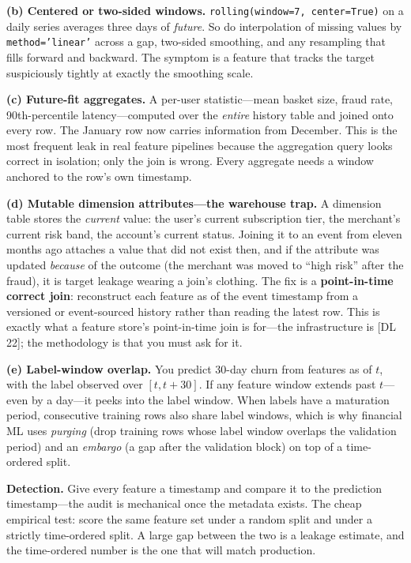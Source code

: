\textbf{(b) Centered or two-sided windows.} \texttt{rolling(window=7, center=True)} on a daily series averages three days of \emph{future}. So do interpolation of missing values by \texttt{method='linear'} across a gap, two-sided smoothing, and any resampling that fills forward and backward. The symptom is a feature that tracks the target suspiciously tightly at exactly the smoothing scale.

\textbf{(c) Future-fit aggregates.} A per-user statistic---mean basket size, fraud rate, 90th-percentile latency---computed over the \emph{entire} history table and joined onto every row. The January row now carries information from December. This is the most frequent leak in real feature pipelines because the aggregation query looks correct in isolation; only the join is wrong. Every aggregate needs a window anchored to the row's own timestamp.

\textbf{(d) Mutable dimension attributes---the warehouse trap.} A dimension table stores the \emph{current} value: the user's current subscription tier, the merchant's current risk band, the account's current status. Joining it to an event from eleven months ago attaches a value that did not exist then, and if the attribute was updated \emph{because} of the outcome (the merchant was moved to ``high risk'' after the fraud), it is target leakage wearing a join's clothing. The fix is a \textbf{point-in-time correct join}: reconstruct each feature as of the event timestamp from a versioned or event-sourced history rather than reading the latest row. This is exactly what a feature store's point-in-time join is for---the infrastructure is [DL 22]; the methodology is that you must ask for it.

\textbf{(e) Label-window overlap.} You predict 30-day churn from features as of $t$, with the label observed over $[t, t{+}30]$. If any feature window extends past $t$---even by a day---it peeks into the label window. When labels have a maturation period, consecutive training rows also share label windows, which is why financial ML uses \emph{purging} (drop training rows whose label window overlaps the validation period) and an \emph{embargo} (a gap after the validation block) on top of a time-ordered split.

\textbf{Detection.} Give every feature a timestamp and compare it to the prediction timestamp---the audit is mechanical once the metadata exists. The cheap empirical test: score the same feature set under a random split and under a strictly time-ordered split. A large gap between the two is a leakage estimate, and the time-ordered number is the one that will match production.

